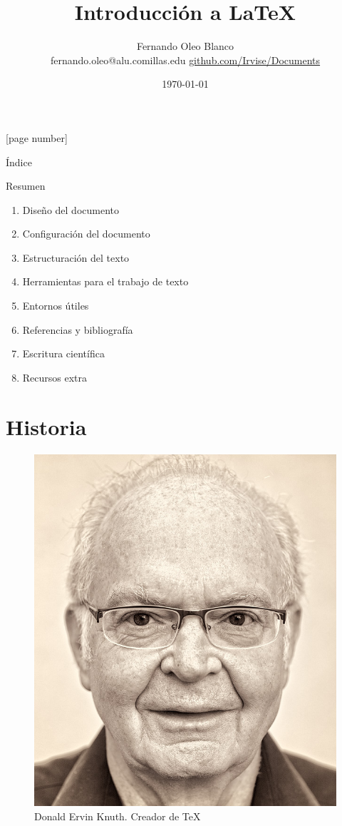 \documentclass[12pt]{beamer}
\begin{document}
	\author{Fernando Oleo Blanco \\ fernando.oleo@alu.comillas.edu \hfill 	\href{https://github.com/Irvise/Documents}{github.com/Irvise/Documents}}
	\title{Introducción a \textrm{\LaTeX}}
	\date{\today}
	[page number]
\begin{frame}[plain]
	\maketitle
\end{frame}

\begin{frame}{Índice}
\tableofcontents
\end{frame}

\begin{frame}{Resumen}
\begin{enumerate}
	\item Diseño del documento
	\item Configuración del documento
	\item Estructuración del texto
	\item Herramientas para el trabajo de texto
	\item Entornos útiles
	\item Referencias y bibliografía
	\item Escritura científica
	\item Recursos extra
\end{enumerate}
\end{frame}

\section{Historia}

\begin{frame}[plain]
	\begin{figure}
		\centering
		\includegraphics[height=0.75\linewidth]{Donald-Knuth-Stanford-Computer-Science}
		\caption{Donald Ervin Knuth. Creador de \TeX}
		\label{fig:donald-knuth-stanford-computer-science}
	\end{figure}
\end{frame}
\end{document}
